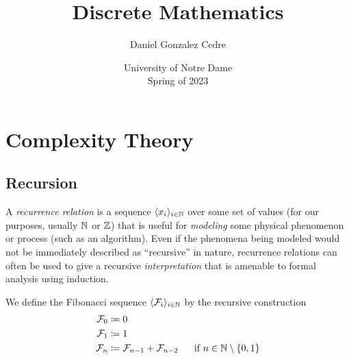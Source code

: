 





\title{Discrete Mathematics}
\author{Daniel Gonzalez Cedre}
\date{University of Notre Dame \\ Spring of 2023}
\maketitle


\setcounter{chapter}{4}
\chapter{Complexity Theory}

\section{Recursion}
\begin{idea}
    A \emph{recurrence relation} is a sequence $\langle x_i\rangle_{i \in \mathbb{N}}$
    over some set of values (for our purposes, usually $\mathbb{N}$ or $\mathbb{Z}$)
    that is useful for \emph{modeling} some physical phenomenon or process (such as an algorithm).
    Even if the phenomena being modeled would not be immediately described as ``recursive'' in nature,
    recurrence relations can often be used to give a recursive \emph{interpretation}
    that is amenable to formal analysis using induction.
\end{idea}

\begin{definition}
    We define the Fibonacci sequence $\langle\mathcal{F}_i\rangle_{i \in \mathbb{N}}$ by the recursive construction
    \begin{align*}
        \mathcal{F}_0 &\defn 0\\
        \mathcal{F}_1 &\defn 1\\
        \mathcal{F}_n &\defn \mathcal{F}_{n - 1} + \mathcal{F}_{n - 2}
            ~~~~\text{ if } n \in \N \setminus \set*{0, 1}
    \end{align*}
\end{definition}

